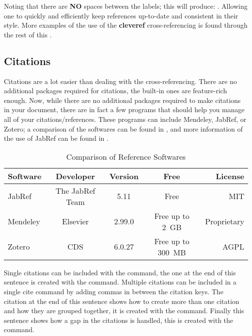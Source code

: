     Noting that there are \textbf{NO} spaces between the labels; this will produce: . Allowing one to quickly and efficiently keep references up-to-date and consistent in their style.
    More examples of the use of the \textbf{cleveref} cross-referencing is found through the rest of this .
  \subsection{Citations}\label{subsec:citations}
      Citations are a lot easier than dealing with the cross-referencing.
      There are no additional packages required for citations, the built-in ones are feature-rich enough.
      Now, while there are no additional packages required to make citations in your document, there are in fact a few programs that should help you manage all of your citations/references.
      These programs can include Mendeley, JabRef, or Zotero; a comparison of the softwares can be found in , and more information of the use of JabRef can be found in .
      
      \begin{table}[htbp]
          \centering
          \caption{Comparison of Reference Softwares}\label{tab:refSoftware}%
            \begin{tabularx}{0.9\textwidth}{Lcccr}
                \toprule
                    Software & Developer & Version & Free & License \\
                \midrule
                    JabRef   & The JabRef Team & 5.11   & Free   & MIT \\
                    Mendeley & Elsevier          & 2.99.0 & {Free up to 2 GB} & Proprietary \\
                    Zotero   & CDS               & 6.0.27 & {Free  up to 300 MB} & AGPL \\
                \bottomrule
            \end{tabularx}%
      \end{table}%
      
      Single citations can be included with the  command, the one at the end of this sentence is created with the  command\cite{TEST}. 
      Multiple citations can be included in a single cite command by adding commas in between the citation keys. The citation at the end of this sentence shows how to create more than one citation and how they are grouped together, it is created with the  command\cite{testone,cite2,cite3,cite4,cite5}.
      Finally this sentence shows how a gap in the citations is handled, this is created with the command\cite{testone,cite2,cite3,cite5}. 
